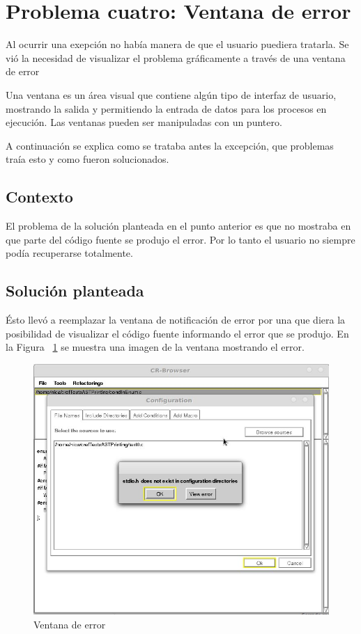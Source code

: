 \documentclass[a4paper,oneside,12pt]{article}
\begin{document}
\section{Problema cuatro: Ventana de error}

Al ocurrir una exepci\'on no hab\'ia manera de que el usuario puediera tratarla. Se vi\'o la necesidad de visualizar el problema gr\'aficamente a trav\'es de una ventana de error

Una ventana es un \'area visual que contiene alg\'un tipo de interfaz de usuario, mostrando la salida y permitiendo la entrada de datos para los procesos en ejecuci\'on. Las ventanas pueden ser manipuladas con un puntero.

A continuaci\'on se explica como se trataba antes la excepci\'on, que problemas tra\'ia esto y como fueron solucionados.

\subsection{Contexto}
El problema de la soluci\'on planteada en el punto anterior es que no mostraba en que parte del c\'odigo fuente se produjo el error. Por lo tanto el usuario no siempre pod\'ia recuperarse totalmente.

\subsection{Soluci\'on planteada}
\'Esto llev\'o a reemplazar la ventana de notificaci\'on de error por una que diera la posibilidad de visualizar el c\'odigo fuente informando el error que se produjo. En la Figura ~\ref{ventana_de_error} se muestra una imagen de la ventana mostrando el error.

\begin{figure}[h!]
  \centering
    \includegraphics[scale=0.50]{images/codigo_modificado/error_header_no_encontrado.jpg}
     \caption{Ventana de error}
     \label{ventana_de_error}
\end{figure}
\end{document}

